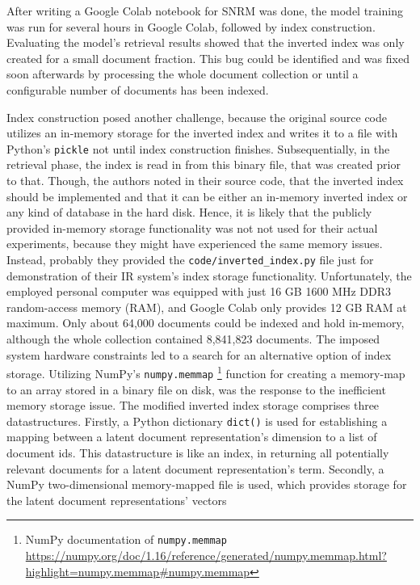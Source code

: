 After writing a Google Colab notebook for SNRM was done, the model training was run for several hours in Google Colab,
    followed by index construction.
Evaluating the model's retrieval results showed that the inverted index was only created for a small document fraction.
This bug could be identified and was fixed soon afterwards by processing the whole document collection or until a
    configurable number of documents has been indexed.

Index construction posed another challenge, because the original source code utilizes an in-memory storage
    for the inverted index and writes it to a file with Python's \texttt{pickle} not until index construction finishes.
Subsequentially, in the retrieval phase, the index is read in from this binary file, that was created prior to that.
Though, the authors noted in their source code, that the inverted index should be implemented and that it can be 
    either an in-memory inverted index or any kind of database in the hard disk.
Hence, it is likely that the publicly provided in-memory storage functionality was not not used for their actual experiments,
    because they might have experienced the same memory issues.
Instead, probably they provided the \verb|code/inverted_index.py| file just for demonstration of their IR system's index
    storage functionality.
Unfortunately, the employed personal computer was equipped with just 16 GB 1600 MHz DDR3 random-access memory (RAM),
    and Google Colab only provides 12 GB RAM at maximum.
Only about 64,000 documents could be indexed and hold in-memory, although the whole collection contained 8,841,823 documents.
The imposed system hardware constraints led to a search for an alternative option of index storage.
Utilizing NumPy's \texttt{numpy.memmap}
    \footnote{NumPy documentation of \texttt{numpy.memmap} \url{https://numpy.org/doc/1.16/reference/generated/numpy.memmap.html?highlight=numpy.memmap\#numpy.memmap}} 
    function for creating a memory-map to an array stored in a binary file on disk, was the response to the 
    inefficient memory storage issue.
The modified inverted index storage comprises three datastructures.
Firstly, a Python dictionary \texttt{dict()} is used for establishing a mapping between a latent document representation's dimension
    to a list of document ids.
This datastructure is like an index, in returning all potentially relevant documents for a latent document representation's term.
Secondly, a NumPy two-dimensional memory-mapped file is used, which provides storage for the latent document representations' vectors
